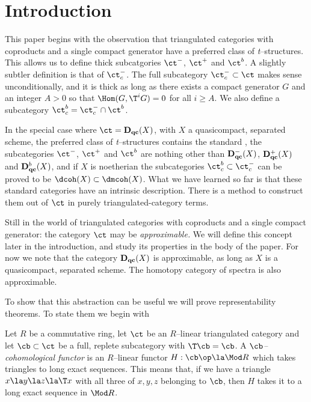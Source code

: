 \documentclass[11pt]{amsart}
\newcommand{\Dqc}{{\mathbf D_{\text{\bf qc}}}}
\newcommand{\Dqcmi}{{\mathbf D_{\text{\bf qc}}^-}}
\newcommand{\Dqcpl}{{\mathbf D_{\text{\bf qc}}^+}}
\newcommand{\Dqcb}{{\mathbf D_{\text{\bf qc}}^b}}
\begin{document}
\maketitle

\tableofcontents

\setcounter{section}{-1}

\section{Introduction}
\label{S0}

This paper begins with the
observation that triangulated categories with coproducts and
a single compact
generator have a preferred class of {\it t}--structures.
This allows us to define thick
subcatgories $\ct^-$, $\ct^+$ and $\ct^b$.
A slightly subtler definition is that of $\ct^-_c$. The full
subcategory $\ct^-_c\subset\ct$
makes sense unconditionally, and it is thick
as long as there exists a compact generator $G$
and an integer $A>0$ so that $\Hom(G,\T^iG)=0$ for all $i\geq A$.
We also define a subcategory $\ct^b_c=\ct^-_c\cap\ct^b$.


In the special case where $\ct=\Dqc(X)$, with $X$ a
quasicompact, separated scheme, the preferred
class of {\it t}--structures contains the standard
\tstr, the subcategories $\ct^-$, $\ct^+$ and $\ct^b$ are
nothing other than $\Dqcmi(X)$, $\Dqcpl(X)$ and $\Dqcb(X)$,
and if $X$ is noetherian the subcategories
$\ct_c^b\subset\ct_c^-$ can be proved
to be $\dcoh(X)\subset\dmcoh(X)$. What we have learned so far is
that these standard categories 
have an intrinsic
description. There is a method
to construct them out of $\ct$ in purely triangulated-category terms.

Still in the world of triangulated categories with coproducts and
a single compact generator: the category $\ct$ may be \emph{approximable.}
We will define this concept later in the introduction, and study its properties
in the body of the paper.
For now we note that the category $\Dqc(X)$ is approximable,
as long as $X$ is a quasicompact, separated
scheme.
The homotopy category of spectra is also approximable.

To show that this abstraction can be useful we will prove representability
theorems. To state them we begin with 

Let $R$ be a commutative ring,
let $\ct$ be an $R$--linear triangulated category
and let $\cb\subset\ct$ be a full, replete subcategory with $\T\cb=\cb$.
A \emph{$\cb$--cohomological functor} is an $R$--linear functor
$H:\cb\op\la\Mod R$
which takes triangles to long exact sequences. This
means that, if we have a triangle $x\la y\la z\la\T x$ with
all three of $x,y,z$ belonging to $\cb$, then $H$ takes it
to a long  exact sequence in $\Mod R$.
\end{document}
